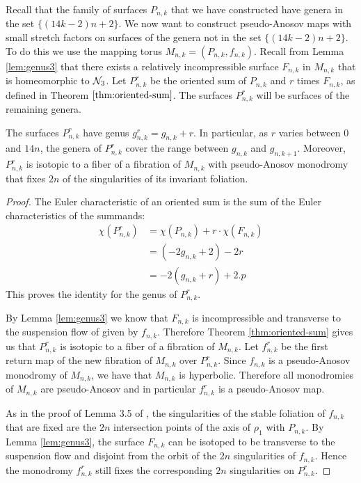 Recall that the family of surfaces $P_{n,k}$ that we have constructed have genera in the set $\{(14k-2)n+2\}$.
We now want to construct pseudo-Anosov maps with small
stretch factors on surfaces of the genera not in the set $\{(14k-2)n+2\}$. To do this we use the mapping torus $M_{n,k}= (P_{n,k},f_{n,k})$. Recall from Lemma \ref{lem:genus3} that there exists a relatively incompressible surface $F_{n,k}$ in $M_{n,k}$ that is homeomorphic to $\mathcal{N}_3$.  Let $P_{n,k}^r$ be the oriented sum of $P_{n,k}$ and
$r$ times $F_{n,k}$, as defined in Theorem $\ref{thm:oriented-sum}$.  The surfaces $P_{n,k}^r$ will be surfaces of the remaining genera.

\begin{lem}
  The surfaces $P^r_{n,k}$ have genus $g^r_{n,k} = g_{n,k} + r$. In particular, as $r$ varies between
  $0$ and $14n$, the genera of $P^r_{n,k}$ cover the range between $g_{n,k}$ and $g_{n,k+1}$. Moreover,
  $P^r_{n,k}$ is isotopic to a fiber of a fibration of $M_{n,k}$ with pseudo-Anosov monodromy that fixes $2n$
  of the singularities of its invariant foliation.
\end{lem}

\begin{proof}
  The Euler characteristic of an oriented sum is the sum of the Euler characteristics of the summands:
  \begin{align*}
    \chi(P^r_{n,k}) &= \chi(P_{n,k}) + r\cdot\chi(F_{n,k}) \\
                    &= (-2g_{n,k} + 2)-2r \\
                    &= -2(g_{n,k} + r) + 2.p
  \end{align*}
  This proves the identity for the genus of $P^r_{n,k}.$

  By Lemma \ref{lem:genus3} we know that $F_{n,k}$ is incompressible and transverse to the suspension flow of given by $f_{n,k}$.  Therefore Theorem \ref{thm:oriented-sum} gives us that $P^r_{n,k}$ is isotopic to a fiber of a fibration of
  $M_{n,k}$. Let $f^r_{n,k}$ be the first return map of the new fibration of $M_{n,k}$ over $P^r_{n,k}$.  Since
  $f_{n,k}$ is a pseudo-Anosov monodromy of $M_{n,k}$, we have that $M_{n,k}$ is hyperbolic.  Therefore all monodromies of $M_{n,k}$ are pseudo-Anosov and in particular $f^r_{n,k}$ is a pseudo-Anosov map.

  As in the proof of Lemma 3.5 of \cite{yazdi2018pseudo}, the singularities of the stable foliation of
  $f_{n,k}$ that are fixed are the $2n$ intersection points of the axis of $\rho_1$ with
  $P_{n,k}$. By Lemma \ref{lem:genus3}, the surface $F_{n,k}$ can be isotoped to be transverse to
  the suspension flow and disjoint from the orbit of the $2n$ singularities of $f_{n,k}$.  Hence the monodromy
  $f^r_{n,k}$ still fixes the corresponding $2n$ singularities on $P^r_{n,k}$.
\end{proof}


